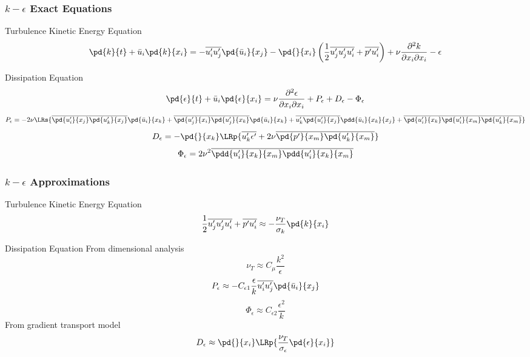 \documentclass{beamer}
\begin{document}
\begin{frame}[shrink=5]\frametitle{$k-\epsilon$ Exact Equations}
\begin{block}{Turbulence Kinetic Energy Equation}
\begin{equation*}
\pd{k}{t}+\bar u_i\pd{k}{x_i}=-\overline{u_i'u_j'}\pd{\bar u_i}{x_j}
-\pd{}{x_i}\left(\frac{1}{2}\overline{u_j'u_j'u_i'}+\overline{p'u_i'}\right)
+\nu\frac{\partial^2 k}{\partial x_i\partial x_i}-\epsilon
\end{equation*}
\end{block}
\begin{block}{Dissipation Equation}
\begin{equation*}
\pd{\epsilon}{t}+\bar u_i\pd{\epsilon}{x_i}=\nu\frac{\partial^2\epsilon}{\partial x_i\partial x_i}
+P_{\epsilon}+D_{\epsilon}-\Phi_\epsilon
\end{equation*}
\[
P_\epsilon=-2\nu\LRs{\overline{\pd{u_i'}{x_j}\pd{u_k'}{x_j}}\pd{\bar u_i}{x_k}
+\overline{\pd{u_j'}{x_i}\pd{u_j'}{x_k}}\pd{\bar u_i}{x_k}
+\overline{u_k'\pd{u_i'}{x_j}}\pdd{\bar u_i}{x_k}{x_j}
+\overline{\pd{u_i'}{x_k}\pd{u_i'}{x_m}\pd{u_k'}{x_m}}
}
\]
\[
D_\epsilon=-\pd{}{x_k}\LRp{\overline{u_k'\epsilon'}+2\nu\overline{\pd{p'}{x_m}\pd{u_k'}{x_m}}}
\]
\[
\Phi_\epsilon=2\nu^2\overline{\pdd{u_i'}{x_k}{x_m}\pdd{u_i'}{x_k}{x_m}}
\]
\end{block}
\end{frame}

\begin{frame}[shrink=5]\frametitle{$k-\epsilon$ Approximations}
\begin{block}{Turbulence Kinetic Energy Equation}
\[
\frac{1}{2}\overline{u_j'u_j'u_i'}+\overline{p'u_i'}\approx-\frac{\nu_T}{\sigma_k}\pd{k}{x_i}
\]
\end{block}
\begin{block}{Dissipation Equation}
From dimensional analysis
\[
\nu_T\approx C_\mu\frac{k^2}{\epsilon}
\]
\[
P_\epsilon\approx-C_{\epsilon1}\frac{\epsilon}{k}\overline{u_i'u_j'}\pd{\bar u_i}{x_j}
\]
\[
\Phi_\epsilon\approx C_{\epsilon2}\frac{\epsilon^2}{k}
\]
From gradient transport model
\[
D_\epsilon\approx\pd{}{x_i}\LRp{\frac{\nu_T}{\sigma_\epsilon}\pd{\epsilon}{x_i}}
\]
\end{block}
\end{frame}
\end{document}
